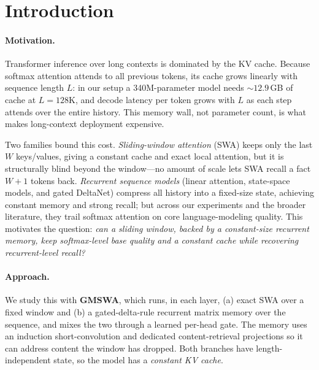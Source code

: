 \documentclass[letterpaper]{article} %
\begin{document}
\section{Introduction}

\paragraph{Motivation.}
Transformer inference over long contexts is dominated by the KV cache. Because softmax attention attends to all previous tokens, its cache grows linearly with sequence length $L$: in our setup a 340M-parameter model needs ${\sim}12.9$\,GB of cache at $L{=}128$K, and decode latency per token grows with $L$ as each step attends over the entire history. This memory wall, not parameter count, is what makes long-context deployment expensive.

Two families bound this cost. \emph{Sliding-window attention} (SWA) keeps only the last $W$ keys/values, giving a constant cache and exact local attention, but it is structurally blind beyond the window---no amount of scale lets SWA recall a fact $W{+}1$ tokens back. \emph{Recurrent sequence models} (linear attention, state-space models, and gated DeltaNet) compress all history into a fixed-size state, achieving constant memory and strong recall; but across our experiments and the broader literature, they trail softmax attention on core language-modeling quality. This motivates the question: \emph{can a sliding window, backed by a constant-size recurrent memory, keep softmax-level base quality and a constant cache while recovering recurrent-level recall?}

\paragraph{Approach.}
We study this with \textbf{GMSWA}, which runs, in each layer, (a) exact SWA over a fixed window and (b) a gated-delta-rule recurrent matrix memory over the sequence, and mixes the two through a learned per-head gate. The memory uses an induction short-convolution and dedicated content-retrieval projections so it can address content the window has dropped. Both branches have length-independent state, so the model has a \emph{constant KV cache}.
\end{document}
